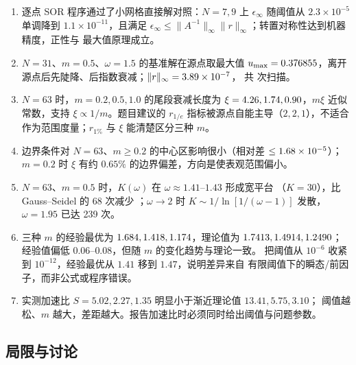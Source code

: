 \documentclass[UTF8,fontset=windows,a4paper,11pt]{ctexart}
\begin{document}
\begin{enumerate}[leftmargin=2.1em,itemsep=0.18em,topsep=0.2em]
\item 逐点 SOR 程序通过了小网格直接解对照：$N=7,9$ 上 $\epsilon_\infty$ 随阈值从
$2.3\times10^{-5}$ 单调降到 $1.1\times10^{-11}$，且满足
$\epsilon_\infty\le\|A^{-1}\|_\infty\|r\|_\infty$；转置对称性达到机器精度，正性与
最大值原理成立。
\item $N=31$、$m=0.5$、$\omega=1.5$ 的基准解在源点取最大值
$u_{\max}=0.376855$，离开源点后先陡降、后指数衰减；$\|r\|_\infty=3.89\times10^{-7}$，
共 \KtaskI{} 次扫描。
\item $N=63$ 时，$m=0.2,0.5,1.0$ 的尾段衰减长度为
$\xi=4.26,1.74,0.90$，$m\xi$ 近似常数，支持 $\xi\propto1/m$。题目建议的
$r_{1/e}$ 指标被源点自能主导（$2,2,1$），不适合作为范围度量；$r_{1\%}$ 与 $\xi$
能清楚区分三种 $m$。
\item 边界条件对 $N=63$、$m\ge0.2$ 的中心区影响很小（相对差
$\le1.68\times10^{-5}$）；$m=0.2$ 时 $\xi$ 有约 $0.65\%$ 的边界偏差，方向是使表观范围偏小。
\item $N=63$、$m=0.5$ 时，$K(\omega)$ 在 $\omega\approx1.41$--$1.43$ 形成宽平台
（$K=30$），比 Gauss--Seidel 的 68 次减少 \RedThree；$\omega\to2$ 时
$K\sim1/\ln[1/(\omega-1)]$ 发散，$\omega=1.95$ 已达 239 次。
\item 三种 $m$ 的经验最优为 $1.684,1.418,1.174$，理论值为
$1.7413,1.4914,1.2490$；经验值偏低 $0.06$--$0.08$，但随 $m$ 的变化趋势与理论一致。
把阈值从 $10^{-6}$ 收紧到 $10^{-12}$，经验最优从 $1.41$ 移到 $1.47$，说明差异来自
有限阈值下的瞬态/前因子，而非公式或程序错误。
\item 实测加速比 $S=5.02,2.27,1.35$ 明显小于渐近理论值 $13.41,5.75,3.10$；
阈值越松、$m$ 越大，差距越大。报告加速比时必须同时给出阈值与问题参数。
\end{enumerate}

\subsection{局限与讨论}
\end{document}
